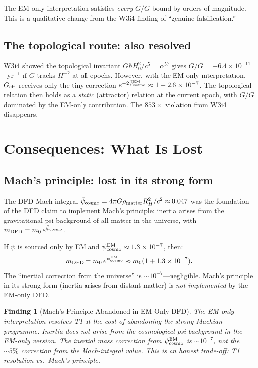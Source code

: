\documentclass[11pt]{article}
\newtheorem{finding}{Finding}
\newcommand{\ee}[1]{\times 10^{#1}}
\newcommand{\Gdot}{\dot{G}/G}
\newcommand{\psicosmo}{\bar{\psi}_{\rm cosmo}}
\begin{document}
The EM-only interpretation satisfies \emph{every} $\Gdot$ bound by orders
of magnitude. This is a qualitative change from the W3i4 finding of
``genuine falsification.''

\subsection{The topological route: also resolved}

W3i4 showed the topological invariant $G\hbar H_0^2/c^5 = \alpha^{57}$
gives $\Gdot = +6.4\ee{-11}$~yr$^{-1}$ if $G$ tracks $H^{-2}$ at all
epochs. However, with the EM-only interpretation, $G_{\rm eff}$ receives
only the tiny correction $e^{-2\psicosmo^{\rm EM}} \approx 1 - 2.6\ee{-7}$.
The topological relation then holds as a \emph{static} (attractor)
relation at the current epoch, with $\dot{G}/G$ dominated by the EM-only
contribution. The $853\times$ violation from W3i4 disappears.

\section{Consequences: What Is Lost}
\label{sec:lost}

\subsection{Mach's principle: lost in its strong form}

The DFD Mach integral $\psicosmo = 4\pi G\bar{\rho}_{\rm matter}R_H^2/c^2
\approx 0.047$ was the foundation of the DFD claim to implement Mach's
principle: inertia arises from the gravitational psi-background of all
matter in the universe, with $m_{\rm DFD} = m_0\,e^{\psicosmo}$.

If $\psi$ is sourced only by EM and $\psicosmo^{\rm EM} \approx 1.3\ee{-7}$,
then:
\begin{equation}
m_{\rm DFD} = m_0\,e^{\psicosmo^{\rm EM}} \approx m_0(1 + 1.3\ee{-7}).
\end{equation}
The ``inertial correction from the universe'' is $\sim 10^{-7}$---negligible.
Mach's principle in its strong form (inertia arises from distant matter)
is \emph{not implemented} by the EM-only DFD.

\begin{finding}[Mach's Principle Abandoned in EM-Only DFD]
\label{find:mach-lost}
The EM-only interpretation resolves T1 at the cost of abandoning the strong
Machian programme. Inertia does \emph{not} arise from the cosmological
psi-background in the EM-only version. The inertial mass correction from
$\psicosmo^{\rm EM}$ is $\sim 10^{-7}$, not the $\sim 5\%$ correction
from the Mach-integral value. This is an honest trade-off: T1 resolution
vs.\ Mach's principle.
\end{finding}
\end{document}
